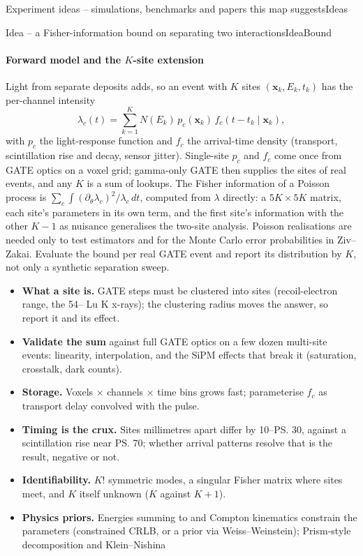 \begin{programnote}{Experiment ideas -- simulations, benchmarks and papers this map suggests}{Ideas}
\begin{papernote}{Idea -- a Fisher-information bound on separating two interactions}{IdeaBound}
\paragraph{Forward model and the $K$-site extension}
Light from separate deposits adds, so an event with $K$ sites
$(\mathbf{x}_k, E_k, t_k)$ has the per-channel intensity
\[ \lambda_c(t) = \sum_{k=1}^{K} N(E_k)\, p_c(\mathbf{x}_k)\,
	f_c(t - t_k \mid \mathbf{x}_k), \]
with $p_c$ the light-response function and $f_c$ the arrival-time density
(transport, scintillation rise and decay, sensor jitter). Single-site $p_c$
and $f_c$ come once from GATE optics on a voxel grid; gamma-only GATE then
supplies the sites of real events, and any $K$ is a sum of lookups. The Fisher
information of a Poisson process is
$\sum_c \int (\partial_\theta \lambda_c)^2 / \lambda_c \, dt$, computed from
$\lambda$ directly: a $5K \times 5K$ matrix, each site's parameters in its own
term, and the first site's information with the other $K-1$ as nuisance
generalises the two-site analysis. Poisson realisations are needed only to
test estimators and for the Monte Carlo error probabilities in Ziv--Zakai.
Evaluate the bound per real GATE event and report its distribution by $K$,
not only a synthetic separation sweep.
\begin{itemize}
	\item \textbf{What a site is.} GATE steps must be clustered into sites
		(recoil-electron range, the 54-- Lu K x-rays); the clustering
		radius moves the answer, so report it and its effect.
	\item \textbf{Validate the sum} against full GATE optics on a few dozen
		multi-site events: linearity, interpolation, and the SiPM effects
		that break it (saturation, crosstalk, dark counts).
	\item \textbf{Storage.} Voxels $\times$ channels $\times$ time bins grows
		fast; parameterise $f_c$ as transport delay convolved with the pulse.
	\item \textbf{Timing is the crux.} Sites millimetres apart differ by
		10--\ps{30}, against a scintillation rise near \ps{70}; whether
		arrival patterns resolve that is the result, negative or not.
	\item \textbf{Identifiability.} $K!$ symmetric modes, a singular Fisher
		matrix where sites meet, and $K$ itself unknown ($K$ against $K+1$).
	\item \textbf{Physics priors.} Energies summing to  and Compton
		kinematics constrain the parameters (constrained CRLB, or a prior via
		Weiss--Weinstein); Prism-style decomposition and Klein--Nishina

\end{itemize}
\end{papernote}
\end{programnote}
